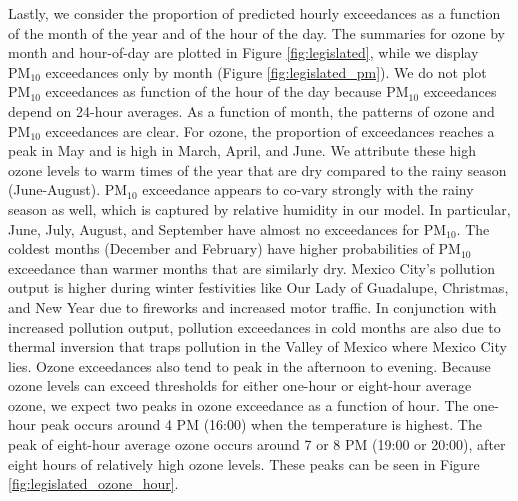 \documentclass[alpha-refs]{wiley-article}
\begin{document}
Lastly, we consider the proportion of predicted hourly exceedances as a function of the month of the year and of the hour of the day. The summaries for ozone by month and hour-of-day are plotted in Figure \ref{fig:legislated}, while we display $\text{PM}_{10}$ exceedances only by month (Figure \ref{fig:legislated_pm}). We do not plot $\text{PM}_{10}$ exceedances as function of the hour of the day because $\text{PM}_{10}$ exceedances depend on 24-hour averages. As a function of month, the patterns of ozone and $\text{PM}_{10}$ exceedances are clear. For ozone, the proportion of exceedances reaches a peak in May and is high in March, April, and June. We attribute these high ozone levels to warm times of the year that are dry compared to the rainy season (June-August).  $\text{PM}_{10}$ exceedance appears to co-vary strongly with the rainy season as well, which is captured by relative humidity in our model. In particular, June, July, August, and September have almost no exceedances for $\text{PM}_{10}$. The coldest months (December and February) have higher probabilities of $\text{PM}_{10}$ exceedance than warmer months that are similarly dry. Mexico City's pollution output is higher during winter festivities like Our Lady of Guadalupe, Christmas, and New Year due to fireworks and increased motor traffic. In conjunction with increased pollution output, pollution exceedances in cold months are also due to thermal inversion that traps pollution in the Valley of Mexico where Mexico City lies. Ozone exceedances also tend to peak in the afternoon to evening. Because ozone levels can exceed thresholds for either one-hour or eight-hour average ozone, we expect two peaks in ozone exceedance as a function of hour. The one-hour peak occurs around 4 PM (16:00) when the temperature is highest. The peak of eight-hour average ozone occurs around 7 or 8 PM (19:00 or 20:00), after eight hours of relatively high ozone levels. These peaks can be seen in Figure \ref{fig:legislated_ozone_hour}.
\end{document}
